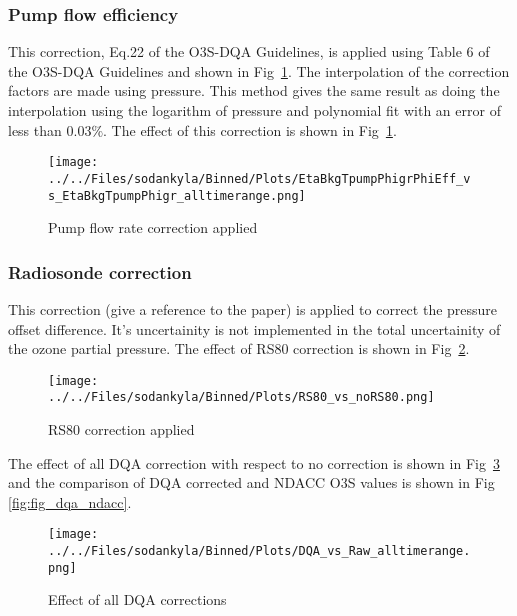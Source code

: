                    \subsubsection{Pump flow efficiency}
    This correction, Eq.22 of the O3S-DQA Guidelines, is applied using Table 6 of the O3S-DQA Guidelines and shown in Fig~\ref{fig:pf_eff}.
The interpolation of the correction factors are made using pressure. This method gives the same result as doing the interpolation using the logarithm of pressure
and polynomial fit with an error of less than $0.03\%$. The effect of this correction is shown in Fig~\ref{fig:pf_eff}.

                        \begin{figure}
        \centering
\texttt{[image: ../../Files/sodankyla/Binned/Plots/EtaBkgTpumpPhigrPhiEff\_vs\_EtaBkgTpumpPhigr\_alltimerange.png]}
    \caption{Pump flow rate correction applied}
            \label{fig:pf_eff}
    \end{figure}

 \subsubsection{Radiosonde correction}
    This correction (give a reference to the paper) is applied to correct the pressure offset difference. It's uncertainity is not implemented in the
total uncertainity of the ozone partial pressure. The effect of RS80 correction is shown in Fig~\ref{fig:rs80}.

                        \begin{figure}
        \centering
\texttt{[image: ../../Files/sodankyla/Binned/Plots/RS80\_vs\_noRS80.png]}
    \caption{RS80 correction applied}
            \label{fig:rs80}
    \end{figure}

The effect of all DQA correction with respect to no correction is shown in Fig~\ref{fig:dqa_all} and the comparison of DQA corrected and NDACC O3S values is shown in Fig~
\ref{fig:fig_dqa_ndacc}.

                        \begin{figure}
        \centering
\texttt{[image: ../../Files/sodankyla/Binned/Plots/DQA\_vs\_Raw\_alltimerange.png]}
    \caption{Effect of all DQA corrections}
            \label{fig:dqa_all}
    \end{figure}

